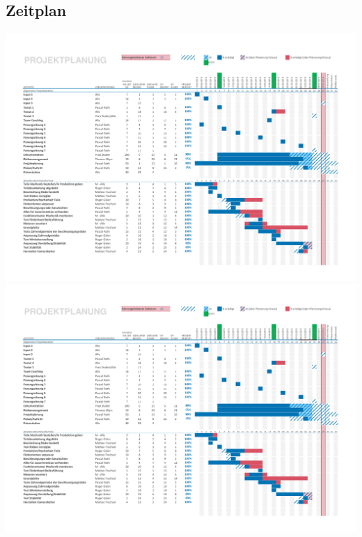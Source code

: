 \begin{landscape}
\subsection{Zeitplan}    
    \includegraphics[page=1,scale=0.87,clip,trim=15mm 15mm 13mm 18mm] {Enddokumentation/Bilder/Projektplanung.pdf}
    \newpage        
    \includegraphics[page=2,scale=0.87,clip,trim=15mm 0mm 13mm 10mm] {Enddokumentation/Bilder/Projektplanung.pdf}
\end{landscape}

